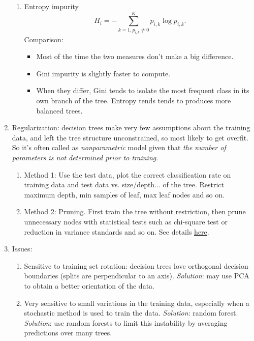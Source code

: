 \documentclass[12pt,oneside,a4paper]{article}
\numberwithin{equation}{section}
\begin{document}
\begin{enumerate}
\begin{enumerate}
\item Entropy impurity
\begin{equation}
H_i = - \sum_{k=1, p_{i, k} \neq 0}^{K} p_{i,k} \log p_{i,k}.
\end{equation}
Comparison:
\begin{itemize}
\item  Most of the time the two measures don't make a big difference. 
\item  Gini impurity is slightly faster to compute. 
\item When they differ, Gini tends to isolate the most frequent class in its own branch of the tree. Entropy tends tends to produces more balanced trees.
\end{itemize}
\end{enumerate}
\item Regularization: decision trees make very few assumptions about the training data, and left the tree structure unconstrained, so most likely to get overfit. So it's often called as \emph{nonparametric} model given that \emph{the number of parameters is not determined prior to training}.
\begin{enumerate}
\item Method 1: Use the test data, plot the correct classification rate on training data and test data vs. size/depth... of the tree. Restrict maximum depth, min samples of leaf, max leaf nodes and so on. 
\item Method 2: Pruning. First train the tree without restriction, then prune unnecessary nodes with statistical tests such as chi-square test or reduction in variance standards and so on. See details \href{https://medium.com/@rishabhjain_22692/decision-trees-it-begins-here-93ff54ef134}{here}.

\end{enumerate}
\item Issues:
\begin{enumerate}
\item Sensitive to training set rotation: decision trees love orthogonal decision boundaries (splits are perpendicular to an axis). \emph{Solution}: may use PCA to obtain a better orientation of the data. 

\item Very sensitive to small variations in the training data, especially when a stochastic method is used to train the data. \emph{Solution}: random forest. \emph{Solution}: use random forests to limit this instability by averaging predictions over many trees. 
\end{enumerate}
\end{enumerate}
\end{document}
